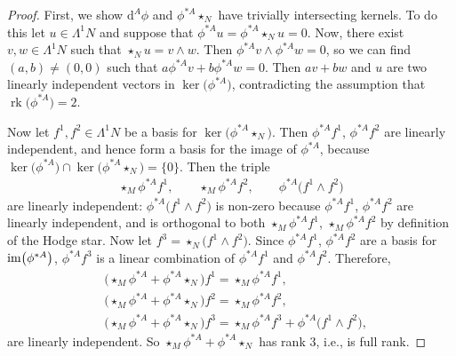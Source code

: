 \documentclass[pdftex]{sigma}
\newcommand{\1}{{\mathbb{1}}}
\def \d{\mathrm{d}}
\newcommand{\rk}{{\operatorname{rk}}}
\numberwithin{equation}{section}
\begin{document}
\begin{proof}
First, we show $\d^A\phi$ and $\phi^{\ast A}\star_{N}$ have trivially intersecting kernels. To do this let $u\in\Lambda^1N$ and suppose that $\phi^{\ast A}u=\phi^{\ast A}\star_{N}u=0$. Now, there exist $v,w\in\Lambda^1N$ such that $\star_{N}u=v\wedge w$. Then $\phi^{\ast A}v\wedge\phi^{\ast A}w=0$, so we can find $(a,b)\neq(0,0)$ such that $a\phi^{\ast A}v+b\phi^{\ast A}w=0$. Then $av+bw$ and $u$ are two linearly independent vectors in $\ker\big(\phi^{\ast A}\big)$, contradicting the assumption that $\rk\big(\phi^{\ast A}\big)=2$.

Now let $f^1,f^2\in\Lambda^1N$ be a basis for $\ker\big(\phi^{\ast A}\star_N\big)$. Then $\phi^{\ast A}f^1$, $\phi^{\ast A}f^2$ are linearly independent, and hence form a basis for the image of $\phi^{\ast A}$, because $\ker\big(\phi^{\ast A}\big)\cap\ker\big(\phi^{\ast A}\star_N\big)=\{0\}$. Then the triple
\begin{align*}
\star_{M}\phi^{\ast A}f^1,\qquad\star_{M}\phi^{\ast A}f^2,\qquad\phi^{\ast A}\big(f^1\wedge f^2\big)
\end{align*}
are linearly independent: $\phi^{\ast A}\big(f^1\wedge f^2\big)$ is non-zero because $\phi^{\ast A}f^1$, $\phi^{\ast A}f^2$ are linearly independent, and is orthogonal to both $\star_{M}\phi^{\ast A}f^1$, $\star_{M}\phi^{\ast A}f^2$ by definition of the Hodge star. Now let $f^3=\star_{N}\big(f^1\wedge f^2\big)$. Since $\phi^{\ast A}f^1$, $\phi^{\ast A}f^2$ are a basis for ${\rm im}\big(\phi^{\ast A}\big)$, $\phi^{\ast A}f^3$ is a linear combination of $\phi^{\ast A}f^1$ and $\phi^{\ast A}f^2$. Therefore,
\begin{align*}
& \bigl(\star_{M}\phi^{\ast A}+\phi^{\ast A}\star_{N}\bigr)f^1=\star_{M}\phi^{\ast A}f^1,\\
& \bigl(\star_{M}\phi^{\ast A}+\phi^{\ast A}\star_{N}\bigr)f^2=\star_{M}\phi^{\ast A}f^2,\\
& \bigl(\star_{M}\phi^{\ast A}+\phi^{\ast A}\star_{N}\bigr)f^3=\star_{M}\phi^{\ast A}f^3+\phi^{\ast A}\big(f^1\wedge f^2\big),
\end{align*}
are linearly independent. So $\star_{M}\phi^{\ast A}+\phi^{\ast A}\star_{N}$ has rank $3$, i.e., is full rank.
\end{proof}
\end{document}
